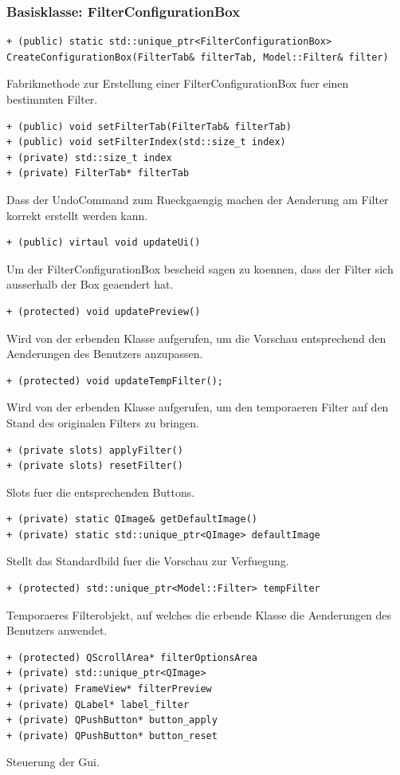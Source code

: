 \documentclass{scrartcl}
\begin{document}
{\subsubsection{Basisklasse: FilterConfigurationBox}
\bigskip
\begin{verbatim}
+ (public) static std::unique_ptr<FilterConfigurationBox>
CreateConfigurationBox(FilterTab& filterTab, Model::Filter& filter)
\end{verbatim}
Fabrikmethode zur Erstellung einer FilterConfigurationBox fuer einen bestimmten Filter.
\bigskip
\begin{verbatim}
+ (public) void setFilterTab(FilterTab& filterTab)
+ (public) void setFilterIndex(std::size_t index)
+ (private) std::size_t index
+ (private) FilterTab* filterTab
\end{verbatim}
Dass der UndoCommand zum Rueckgaengig machen der Aenderung am Filter korrekt erstellt werden kann.
\bigskip
\begin{verbatim}
+ (public) virtaul void updateUi()
\end{verbatim}
Um der FilterConfigurationBox bescheid sagen zu koennen, dass der Filter sich ausserhalb der Box geaendert hat.
\bigskip
\begin{verbatim}
+ (protected) void updatePreview()
\end{verbatim}
Wird von der erbenden Klasse aufgerufen, um die Vorschau entsprechend den Aenderungen des Benutzers anzupassen.
\bigskip
\begin{verbatim}
+ (protected) void updateTempFilter();
\end{verbatim}
Wird von der erbenden Klasse aufgerufen, um den temporaeren Filter auf den Stand des originalen Filters zu bringen.
\bigskip
\begin{verbatim}
+ (private slots) applyFilter()
+ (private slots) resetFilter()
\end{verbatim}
Slots fuer die entsprechenden Buttons.
\bigskip
\begin{verbatim}
+ (private) static QImage& getDefaultImage()
+ (private) static std::unique_ptr<QImage> defaultImage
\end{verbatim}
Stellt das Standardbild fuer die Vorschau zur Verfuegung.
\bigskip
\begin{verbatim}
+ (protected) std::unique_ptr<Model::Filter> tempFilter
\end{verbatim}
Temporaeres Filterobjekt, auf welches die erbende Klasse die Aenderungen des Benutzers anwendet.
\bigskip
\begin{verbatim}
+ (protected) QScrollArea* filterOptionsArea
+ (private) std::unique_ptr<QImage>
+ (private) FrameView* filterPreview
+ (private) QLabel* label_filter
+ (private) QPushButton* button_apply
+ (private) QPushButton* button_reset
\end{verbatim}
Steuerung der Gui.
\bigskip
}
\end{document}
